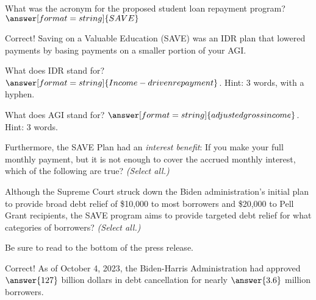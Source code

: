 \documentclass[handout,space,nooutcomes]{ximera}
\begin{document}
\begin{question}
What was the acronym for the proposed student loan repayment program?  $\answer[format=string]{SAVE}$
\begin{question}
Correct!  Saving on a Valuable Education (SAVE) was an IDR plan that lowered payments by basing payments on a smaller portion of your AGI.  

What does IDR stand for?  $\answer[format=string]{Income-driven repayment}$.  Hint: 3 words, with a hyphen. 

What does AGI stand for?  $\answer[format=string]{adjusted gross income}$. Hint: 3 words. 

Furthermore, the SAVE Plan had an \emph{interest benefit}: If you make your full monthly payment, but it is not enough to cover the accrued monthly interest, which of the following are true? \emph{(Select all.)} 
\begin{selectAll}
\end{selectAll}
\end{question}

\begin{question}
Although the Supreme Court struck down the Biden administration's initial plan to provide broad debt relief of \$10,000 to most borrowers and \$20,000 to Pell Grant recipients, the SAVE program aims to provide targeted debt relief for what categories of borrowers?  \emph{(Select all.)}
\begin{selectAll}
\end{selectAll}
\begin{feedback}[incorrect]
Be sure to read to the bottom of the press release.
\end{feedback}
\begin{question}
Correct!  As of October 4, 2023, the Biden-Harris Administration had approved $\answer{127}$ billion dollars in debt cancellation for nearly $\answer{3.6}$ million borrowers.  
\end{question}
\end{question}
\end{question}
\end{document}
